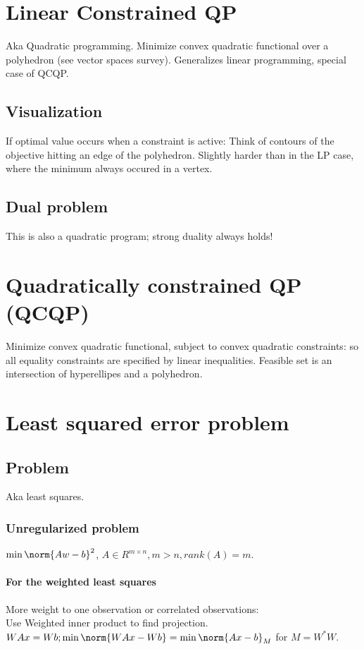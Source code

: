 \documentclass[oneside, article]{memoir}
\begin{document}
\chapter{Linear Constrained QP}
Aka Quadratic programming. Minimize convex quadratic functional over a polyhedron (see vector spaces survey). Generalizes linear programming, special case of QCQP.

\section{Visualization}
If optimal value occurs when a constraint is active: Think of contours of the objective hitting an edge of the polyhedron. Slightly harder than in the LP case, where the minimum always occured in a vertex.

\section{Dual problem}
This is also a quadratic program; strong duality always holds! \chk

\chapter{Quadratically constrained QP (QCQP)}
Minimize convex quadratic functional, subject to convex quadratic constraints: so all equality constraints are specified by linear inequalities. Feasible set is an intersection of hyperellipes and a polyhedron.

\chapter{Least squared error problem}
\section{Problem}
Aka least squares.

\subsection{Unregularized problem}
$\min \norm{Aw - b}^{2}$, $A \in R^{m \times n}, m>n, rank(A) = m$.

\subsubsection{For the weighted least squares}
More weight to one observation or correlated observations:\\ Use Weighted inner product to find projection.\\
$WAx = Wb; \min \norm{WAx - Wb} = \min \norm{Ax-b}_{M}$ for $M=W^{*}W$.
\end{document}
